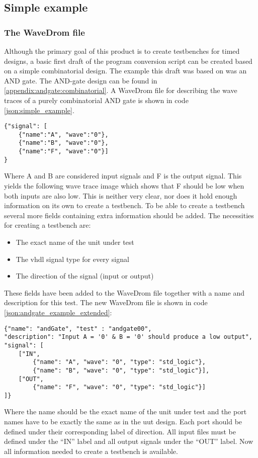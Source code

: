 \subsection{Simple example}
\subsubsection{The WaveDrom file}
Although the primary goal of this product is to create testbenches for timed designs, a basic first draft of the program conversion script can be created based on a simple combinatorial design.
\npar
The example this draft was based on was an AND gate. The AND-gate design can be found in \ref{appendix:andgate:combinatorial}.
\npar
A WaveDrom file for describing the wave traces of a purely combinatorial AND gate is shown in code \ref{json:simple_example}.
\begin{lstlisting}[style=json, caption={Standard WaveDrom description for a combinatorial AND-gate}, label={json:simple_example}]
{"signal": [
	{"name":"A", "wave":"0"},
	{"name":"B", "wave":"0"},
	{"name":"F", "wave":"0"}]  
}
\end{lstlisting}\noindent
Where A and B are considered input signals and F is the output signal. This yields the following wave trace image which shows that F should be low when both inputs are also low.
\nline
This is neither very clear, nor does it hold enough information on its own to create a testbench.
To be able to create a testbench several more fields containing extra information should be added.
\npar
The necessities for creating a testbench are:
\begin{itemize}
	\item The exact name of the unit under test
	\item The vhdl signal type for every signal
	\item The direction of the signal (input or output)
\end{itemize}\noindent
These fields have been added to the WaveDrom file together with a name and description for this test. The new WaveDrom file is shown in code \ref{json:andgate_example_extended}:\newpage
\begin{lstlisting}[style=json, caption={Extended WaveDrom description for a combinatorial AND-gate}, label={json:andgate_example_extended}]
{"name": "andGate", "test" : "andgate00", 
"description": "Input A = '0' & B = '0' should produce a low output", 
"signal": [
	["IN",
		{"name": "A", "wave": "0", "type": "std_logic"},
		{"name": "B", "wave": "0", "type": "std_logic"}],
	["OUT",
		{"name": "F", "wave": "0", "type": "std_logic"}]
]}
\end{lstlisting}\noindent
Where the name should be the exact name of the unit under test and the port names have to be exactly the same as in the uut design. Each port should be defined under their corresponding label of direction. All input files must be defined under the “IN” label and all output signals under the “OUT” label. Now all information needed to create a testbench is available.
